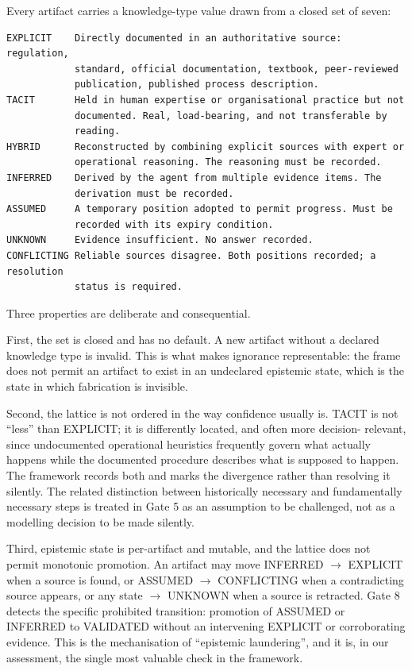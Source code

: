 \documentclass[11pt,a4paper]{article}
\begin{document}
Every artifact carries a knowledge-type value drawn from a closed set of seven:

\begin{Verbatim}[fontsize=\footnotesize,breaklines=true,breakanywhere=true,breakautoindent=false,samepage=false]
EXPLICIT    Directly documented in an authoritative source: regulation,
            standard, official documentation, textbook, peer-reviewed
            publication, published process description.
TACIT       Held in human expertise or organisational practice but not
            documented. Real, load-bearing, and not transferable by
            reading.
HYBRID      Reconstructed by combining explicit sources with expert or
            operational reasoning. The reasoning must be recorded.
INFERRED    Derived by the agent from multiple evidence items. The
            derivation must be recorded.
ASSUMED     A temporary position adopted to permit progress. Must be
            recorded with its expiry condition.
UNKNOWN     Evidence insufficient. No answer recorded.
CONFLICTING Reliable sources disagree. Both positions recorded; a resolution
            status is required.
\end{Verbatim}

Three properties are deliberate and consequential.

First, the set is closed and has no default. A new artifact without a declared knowledge type is invalid. This is what makes ignorance representable: the frame does not permit an artifact to exist in an undeclared epistemic state, which is the state in which fabrication is invisible.

Second, the lattice is not ordered in the way confidence usually is. TACIT is not ``less'' than EXPLICIT; it is differently located, and often more decision- relevant, since undocumented operational heuristics frequently govern what actually happens while the documented procedure describes what is supposed to happen. The framework records both and marks the divergence rather than resolving it silently. The related distinction between historically necessary and fundamentally necessary steps is treated in Gate 5 as an assumption to be challenged, not as a modelling decision to be made silently.

Third, epistemic state is per-artifact and mutable, and the lattice does not permit monotonic promotion. An artifact may move INFERRED $\rightarrow$ EXPLICIT when a source is found, or ASSUMED $\rightarrow$ CONFLICTING when a contradicting source appears, or any state $\rightarrow$ UNKNOWN when a source is retracted. Gate 8 detects the specific prohibited transition: promotion of ASSUMED or INFERRED to VALIDATED without an intervening EXPLICIT or corroborating evidence. This is the mechanisation of ``epistemic laundering'', and it is, in our assessment, the single most valuable check in the framework.
\end{document}
